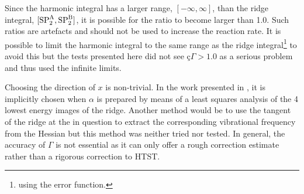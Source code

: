 Since the harmonic integral has a larger range, $[-\infty, \infty]$, than the ridge integral, $[\text{SP}_{2}^\text{A}, \text{SP}_{2}^\text{B}]$, it is possible for the ratio to become larger than 1.0.
Such ratios are artefacts and should not be used to increase the reaction rate.
It is possible to limit the harmonic integral to the same range as the ridge integral\footnote{using the error function.} to avoid this but the tests presented here did not see $ç\Gamma > 1.0$ as a serious problem and thus used the infinite limits.

Choosing the direction of $x$ is non-trivial.
In the work presented in , it is implicitly chosen when $\alpha$ is prepared by means of a least squares analysis of the 4 lowest energy images of the ridge.
Another method would be to use the tangent of the ridge at the  in question to extract the corresponding vibrational frequency from the Hessian but this method was neither tried nor tested.
In general, the accuracy of $\Gamma$ is not essential as it can only offer a rough correction estimate rather than a rigorous correction to HTST.
